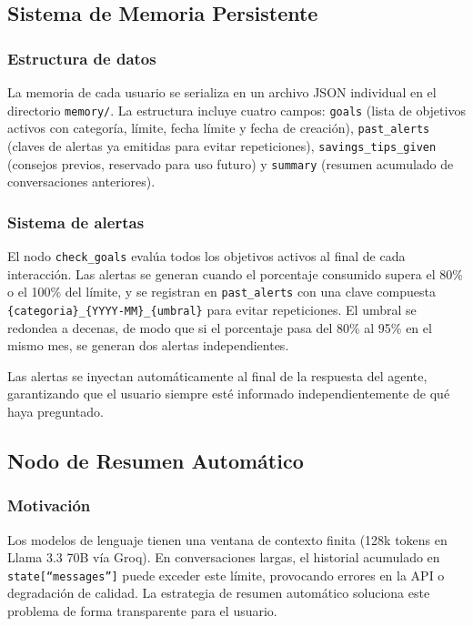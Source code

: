 \subsection{Sistema de Memoria Persistente}
\label{subsec:memoria_persistente}

\subsubsection{Estructura de datos}

La memoria de cada usuario se serializa en un archivo JSON individual en el directorio \texttt{memory/}. La estructura incluye cuatro campos: \texttt{goals} (lista de objetivos activos con categoría, límite, fecha límite y fecha de creación), \texttt{past\_alerts} (claves de alertas ya emitidas para evitar repeticiones), \texttt{savings\_tips\_given} (consejos previos, reservado para uso futuro) y \texttt{summary} (resumen acumulado de conversaciones anteriores).

\newpage
\subsubsection{Sistema de alertas}

El nodo \texttt{check\_goals} evalúa todos los objetivos activos al final de cada interacción. Las alertas se generan cuando el porcentaje consumido supera el 80\% o el 100\% del límite, y se registran en \texttt{past\_alerts} con una clave compuesta \texttt{\{categoria\}\_\{YYYY-MM\}\_\{umbral\}} para evitar repeticiones. El umbral se redondea a decenas, de modo que si el porcentaje pasa del 80\% al 95\% en el mismo mes, se generan dos alertas independientes.

Las alertas se inyectan automáticamente al final de la respuesta del agente, garantizando que el usuario siempre esté informado independientemente de qué haya preguntado.

\subsection{Nodo de Resumen Automático}
\label{subsec:nodo_resumen}

\subsubsection{Motivación}

Los modelos de lenguaje tienen una ventana de contexto finita (128k tokens en Llama 3.3 70B vía Groq). En conversaciones largas, el historial acumulado en \texttt{state[``messages'']} puede exceder este límite, provocando errores en la API o degradación de calidad. La estrategia de resumen automático soluciona este problema de forma transparente para el usuario.

